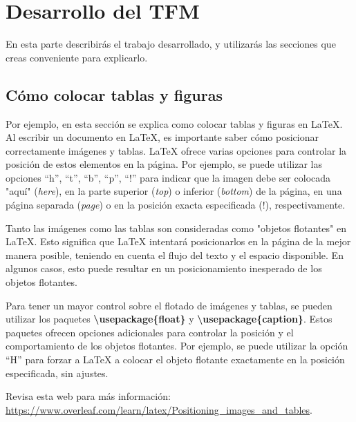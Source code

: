 \chapter{Desarrollo del TFM}\label{chapter:desarrollo}

En esta parte describirás el trabajo desarrollado, y utilizarás las secciones que creas conveniente para explicarlo.

\section{Cómo colocar tablas y figuras}

Por ejemplo, en esta sección se explica como colocar tablas y figuras en \LaTeX{}. Al escribir un documento en \LaTeX{}, es importante saber cómo posicionar correctamente imágenes y tablas. \LaTeX{} ofrece varias opciones para controlar la posición de estos elementos en la página. Por ejemplo, se puede utilizar las opciones ``h'', ``t'', ``b'', ``p'', ``!'' para indicar que la imagen debe ser colocada "aquí" (\emph{here}), en la parte superior (\emph{top}) o inferior (\emph{bottom}) de la página, en una página separada (\emph{page}) o en la posición exacta especificada (!), respectivamente.

Tanto las imágenes como las tablas son consideradas como "objetos flotantes" en \LaTeX{}. Esto significa que \LaTeX{} intentará posicionarlos en la página de la mejor manera posible, teniendo en cuenta el flujo del texto y el espacio disponible. En algunos casos, esto puede resultar en un posicionamiento inesperado de los objetos flotantes.

Para tener un mayor control sobre el flotado de imágenes y tablas, se pueden utilizar los paquetes \textbf{\textbackslash usepackage\{float\}} y \textbf{\textbackslash usepackage\{caption\}}. Estos paquetes ofrecen opciones adicionales para controlar la posición y el comportamiento de los objetos flotantes. Por ejemplo, se puede utilizar la opción ``H'' para forzar a \LaTeX{} a colocar el objeto flotante exactamente en la posición especificada, sin ajustes. 

Revisa esta web para más información: \url{https://www.overleaf.com/learn/latex/Positioning_images_and_tables}.

